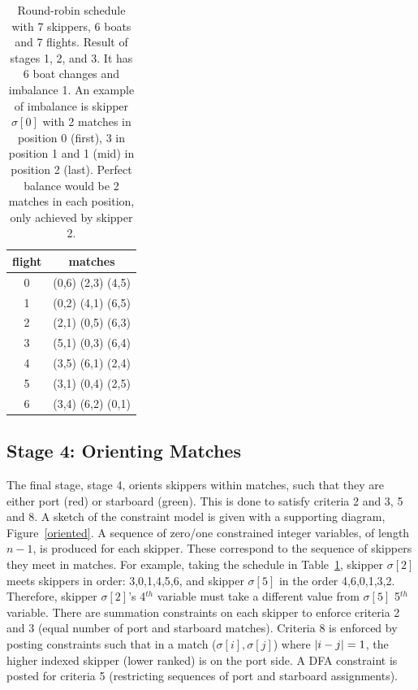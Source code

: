 \documentclass{llncs}
\DeclarePairedDelimiter\abs{\lvert}{\rvert}
\begin{document}
\begin{table}[tb]
\begin{center}
\begin{tabular}{cc} \\
flight & matches \\ \hline
0 & (0,6) (2,3) (4,5) \\
1 & (0,2) (4,1) (6,5) \\
2 & (2,1) (0,5) (6,3) \\
3 & (5,1) (0,3) (6,4) \\
4 & (3,5) (6,1) (2,4) \\
5 & (3,1) (0,4) (2,5) \\
6 & (3,4) (6,2) (0,1) \\ \hline
\end{tabular}
\end{center}
\caption{Round-robin schedule with 7 skippers, 6 boats and 7 flights. Result of
stages 1, 2, and 3. It has 6 boat changes and imbalance 1. An example of
imbalance is skipper $\sigma[{0}]$ with 2 matches in position 0 (first), 3 in
position 1 and 1 (mid) in position 2 (last). Perfect balance would be 2 matches
in each position, only achieved by skipper 2.}
\label{tab2}
\end{table}

\subsection{Stage 4: Orienting Matches}

The final stage, stage 4, orients skippers within matches, such that they are
either port (red) or starboard (green). This is done to satisfy criteria 2 and
3, 5 and 8. A sketch of the constraint model is given with a supporting
diagram, Figure~\ref{oriented}.  A sequence of zero/one constrained integer
variables, of length $n-1$, is produced for each skipper. These correspond to
the sequence of skippers they meet in matches. For example, taking the schedule
in Table~\ref{tab2}, skipper $\sigma[{2}]$ meets skippers in order:
3,0,1,4,5,6, and skipper $\sigma[{5}]$ in the order 4,6,0,1,3,2.  Therefore,
skipper $\sigma[{2}]$'s 4$^{th}$ variable must take a different value from
$\sigma[{5}]$ 5$^{th}$ variable. There are summation constraints on each
skipper to enforce criteria 2 and 3 (equal number of port and starboard
matches). Criteria 8 is enforced by posting constraints such that in a match
($\sigma[{i}],\sigma[{j}]$) where $\abs*{i - j} = 1$, the higher indexed skipper
(lower ranked) is on the port side. A DFA constraint is posted for criteria 5
(restricting sequences of port and starboard assignments).
\end{document}
